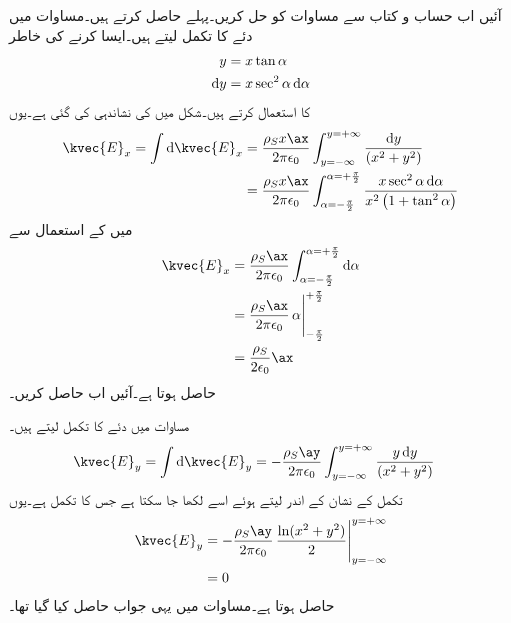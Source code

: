 آئیں اب حساب و کتاب سے مساوات  کو حل کریں۔پہلے  حاصل کرتے ہیں۔مساوات  میں دئے  کا تکمل لیتے ہیں۔ایسا کرنے کی خاطر
\begin{gather}
\begin{aligned}\label{مساوات_کولمب_مماس_کی_مدد_سے_تکملہ_کا_حصول}
y&=x \tan \alpha\\
\dif y &=x \sec^2 \alpha \dif \alpha
\end{aligned}
\end{gather}
کا استعمال کرتے ہیں۔شکل  میں  کی نشاندہی کی گئی ہے۔یوں
\begin{align*}
\kvec{E}_x=\int \dif \kvec{E}_x &=\frac{\rho_S x \ax}{2\pi \epsilon_0}\int_{y=-\infty}^{y=+\infty}\frac{\dif y }{ \left(x^2+y^2\right)}\\
&=\frac{\rho_S x \ax}{2\pi \epsilon_0}\int_{\alpha=-\frac{\pi}{2}}^{\alpha=+\frac{\pi}{2}} \frac{x \sec^2 \alpha \dif \alpha}{x^2\left(1+ \tan^2 \alpha\right)}
\end{align*}
میں  کے استعمال سے
\begin{gather}
\begin{aligned}\label{مساوات_کولمب_لامحدود_سطح_عمودی_جزو}
\kvec{E}_x&=\frac{\rho_S\ax}{2\pi \epsilon_0}\int_{\alpha=-\frac{\pi}{2}}^{\alpha=+\frac{\pi}{2}}\dif \alpha\\
&=\frac{\rho_S\ax}{2\pi \epsilon_0} \eval{\alpha}_{-\frac{\pi}{2}}^{+\frac{\pi}{2}}\\
&=\frac{\rho_S}{2 \epsilon_0}\ax
\end{aligned}
\end{gather}
حاصل ہوتا ہے۔آئیں اب  حاصل کریں۔

مساوات  میں دئے  کا تکمل لیتے ہیں۔
\begin{align*}
\kvec{E}_y=\int \dif \kvec{E}_y&=-\frac{\rho_S \ay}{2 \pi \epsilon_0} \int_{y=-\infty}^{y=+\infty}\frac{ y\dif y }{ \left(x^2+y^2\right)}
\end{align*}
تکمل کے نشان کے اندر  لیتے ہوئے  اسے  لکھا جا سکتا ہے جس کا تکمل  ہے۔یوں
\begin{gather}
\begin{aligned}\label{مساوات_کولمب_لامحدود_سطح_افقی_جزو}
\kvec{E}_y&=-\frac{\rho_S \ay}{2 \pi \epsilon_0} \eval{\frac{\ln(x^2+y^2)}{2}}_{y=-\infty}^{y=+\infty}\\
&=0
\end{aligned}
\end{gather}
حاصل ہوتا ہے۔مساوات  میں یہی جواب حاصل کیا گیا تھا۔

